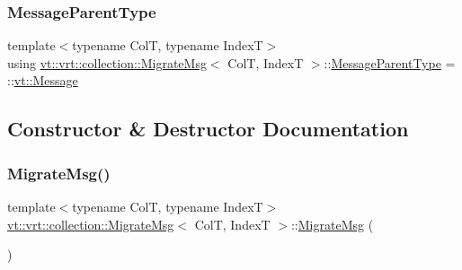\subsubsection{\texorpdfstring{Message\+Parent\+Type}{MessageParentType}}
{\footnotesize\ttfamily template$<$typename ColT, typename IndexT$>$ \\
using \hyperlink{structvt_1_1vrt_1_1collection_1_1_migrate_msg}{vt\+::vrt\+::collection\+::\+Migrate\+Msg}$<$ ColT, IndexT $>$\+::\hyperlink{structvt_1_1messaging_1_1_active_msg_ac2e6d93267991027ce78c968b17064c7}{Message\+Parent\+Type} =  \+::\hyperlink{namespacevt_a3a3ddfef40b4c90915fa43cdd5f129ea}{vt\+::\+Message}}



\subsection{Constructor \& Destructor Documentation}
\mbox{\label{structvt_1_1vrt_1_1collection_1_1_migrate_msg_a0b41c5d241e067dadb4648653f9909bc}} 
\subsubsection{\texorpdfstring{Migrate\+Msg()}{MigrateMsg()}\hspace{0.1cm}{\footnotesize\ttfamily [1/2]}}
{\footnotesize\ttfamily template$<$typename ColT, typename IndexT$>$ \\
\hyperlink{structvt_1_1vrt_1_1collection_1_1_migrate_msg}{vt\+::vrt\+::collection\+::\+Migrate\+Msg}$<$ ColT, IndexT $>$\+::\hyperlink{structvt_1_1vrt_1_1collection_1_1_migrate_msg}{Migrate\+Msg} (\begin{DoxyParamCaption}{ }\end{DoxyParamCaption})\hspace{0.3cm}{\ttfamily [default]}}

\mbox{\label{structvt_1_1vrt_1_1collection_1_1_migrate_msg_a900313445de89550eca07334a2ca21ba}} 
